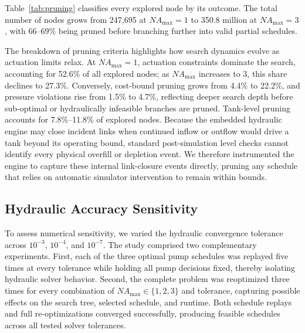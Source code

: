 \documentclass[Journal,letterpaper,InsideFigs]{ascelike-new}
\begin{document}
Table~\ref{tab:pruning} classifies every explored node by its outcome. The total number of nodes grows from 247,695 at $NA_{\max}=1$ to 350.8 million at $NA_{\max}=3$, with 66--69\% being pruned before branching further into valid partial schedules.

\begin{table}[htbp]
	\centering
	\caption{Node classifications and explored-node counts for the final 24-hour searches.}
	\label{tab:pruning}
	\small
	
\end{table}

The breakdown of pruning criteria highlights how search dynamics evolve as actuation limits relax. At $NA_{\max}=1$, actuation constraints dominate the search, accounting for 52.6\% of all explored nodes; as $NA_{\max}$ increases to 3, this share declines to 27.3\%. Conversely, cost-bound pruning grows from 4.4\% to 22.2\%, and pressure violations rise from 1.5\% to 4.7\%, reflecting deeper search depth before sub-optimal or hydraulically infeasible branches are pruned. Tank-level pruning accounts for 7.8\%--11.8\% of explored nodes. Because the embedded hydraulic engine may close incident links when continued inflow or outflow would drive a tank beyond its operating bound, standard post-simulation level checks cannot identify every physical overfill or depletion event. We therefore instrumented the engine to capture these internal link-closure events directly, pruning any schedule that relies on automatic simulator intervention to remain within bounds.

\subsection{Hydraulic Accuracy Sensitivity}
\label{sec:accuracy_sensitivity}

To assess numerical sensitivity, we varied the hydraulic convergence tolerance across $10^{-3}$, $10^{-4}$, and $10^{-7}$. The study comprised two complementary experiments. First, each of the three optimal pump schedules was replayed five times at every tolerance while holding all pump decisions fixed, thereby isolating hydraulic solver behavior. Second, the complete problem was reoptimized three times for every combination of $NA_{\max}\in\{1,2,3\}$ and tolerance, capturing possible effects on the search tree, selected schedule, and runtime. Both schedule replays and full re-optimizations converged successfully, producing feasible schedules across all tested solver tolerances.
\end{document}
